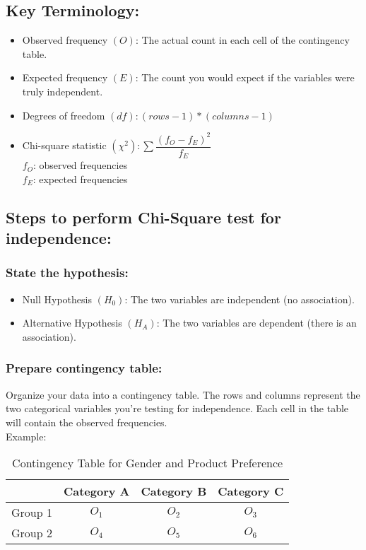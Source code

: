 \documentclass[12pt]{article}
\begin{document}
\subsection{Key Terminology:}
\begin{itemize}

\item Observed frequency $(O)$: The actual count in each cell of the contingency table.
\item Expected frequency $(E)$: The count you would expect if the variables were truly independent.
\item Degrees of freedom $ \left(df\right): (rows-1) * (columns-1)$
\item Chi-square statistic $(\chi^2): \sum \dfrac{(f_O - f_E)^2}{f_E}$\\[4pt]

$f_O$: observed frequencies\\
$f_E$: expected frequencies

\end{itemize}

\subsection{Steps to perform Chi-Square test for independence:}

\subsubsection{State the hypothesis:}
\begin{itemize}
\item Null Hypothesis $(H_0)$: The two variables are independent (no association).

\item Alternative Hypothesis $(H_A)$: The two variables are dependent (there is an association).
\end{itemize}

\subsubsection{Prepare contingency table:}
Organize your data into a contingency table. The rows and columns represent the two categorical variables you're testing for independence. Each cell in the table will contain the observed frequencies.\\
Example:

\begin{table}[h]
\centering
\begin{tabular}{|c|c|c|c|}
  \hline
  & Category A & Category B & Category C \\
  \hline
  Group 1 & $O_1$ & $O_2$ &$O_3$ \\
  Group 2 & $O_4$ & $O_5$ &$O_6$ \\
  \hline
 
\end{tabular}
\caption{Contingency Table for Gender and Product Preference}
\label{tab:chi2example}
\end{table}
\end{document}
